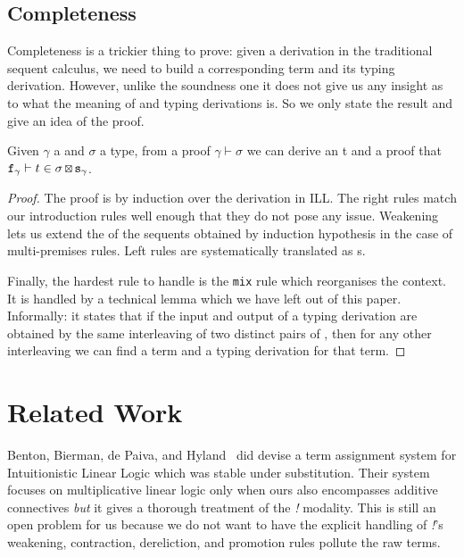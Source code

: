 \subsection{Completeness}

Completeness is a trickier thing to prove: given a derivation in
the traditional sequent calculus, we need to build a corresponding
term and its typing derivation. However, unlike the soundness one
it does not give us any insight as to what the meaning of \Usages{}
and typing derivations is. So we only state the result and give
an idea of the proof.

\begin{theorem}[Completeness] Given \ensuremath{\gamma} a \List{\Type{}} and \ensuremath{\sigma} a type,
from a proof $\ensuremath{\gamma} \ensuremath{\vdash} \ensuremath{\sigma}$ we can derive an \Inferable{} t and a proof that
$\texttt{f}_{\gamma} \vdash t \in \sigma \,{\scriptstyle \boxtimes{}}\,{} \texttt{s}_{\gamma}$.
\end{theorem}
\begin{proof}
The proof is by induction over the derivation in ILL. The right rules
match our introduction rules well enough that they do not pose any
issue. Weakening lets us extend the \Usages{} of the sequents obtained
by induction hypothesis in the case of multi-premises rules. Left rules
are systematically translated as \cut{}s.

Finally, the hardest rule to handle is the \texttt{mix} rule which
reorganises the context. It is handled by a technical lemma which we
have left out of this paper. Informally: it states that if the input
and output \Usages{} of a typing derivation are obtained by the same
interleaving of two distinct pairs of \Usages{}, then for any other
interleaving we can find a term and a typing derivation for that term.
\end{proof}



\section{Related Work}

Benton, Bierman, de Paiva, and Hyland~\cite{benton1993term} did devise a
term assignment system for Intuitionistic Linear Logic which was stable
under substitution. Their system focuses on multiplicative linear logic
only when ours also encompasses additive connectives \emph{but} it gives
a thorough treatment of the \textit{!} modality. This is still an open
problem for us because we do not want to have the explicit handling of
\textit{!}'s weakening, contraction, dereliction, and promotion rules
pollute the raw terms.

